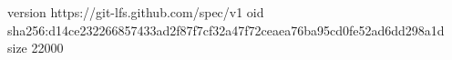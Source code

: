 version https://git-lfs.github.com/spec/v1
oid sha256:d14ce232266857433ad2f87f7cf32a47f72ceaea76ba95cd0fe52ad6dd298a1d
size 22000
